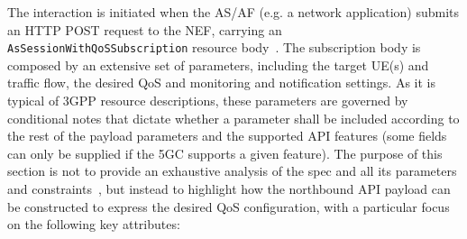 The interaction is initiated when the \acs{AS}/\acs{AF} (e.g. a network application) submits an HTTP POST request to the \acs{NEF}, carrying an \texttt{AsSessionWithQoSSubscription} resource body~\cite{ETSI_TS_129_122_V18_8_0}. The subscription body is composed by an extensive set of parameters, including the target \acs{UE}(s) and traffic flow, the desired \acs{QoS} and monitoring and notification settings. As it is typical of \acs{3GPP} resource descriptions, these parameters are governed by conditional notes that dictate whether a parameter shall be included according to the rest of the payload parameters and the supported \acs{API} features (some fields can only be supplied if the \acs{5GC} supports a given feature). The purpose of this section is not to provide an exhaustive analysis of the spec and all its parameters and constraints~\cite{ETSI_TS_129_122_V18_8_0}, but instead to highlight how the northbound \acs{API} payload can be constructed to express the desired \acs{QoS} configuration, with a particular focus on the following key attributes: 
